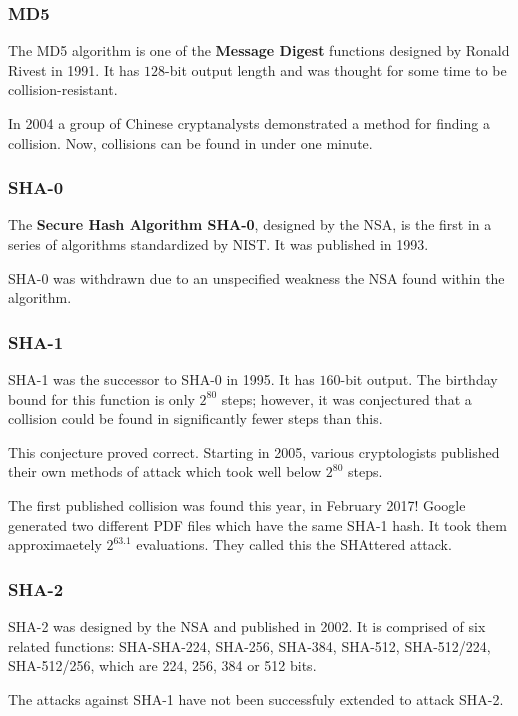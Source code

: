 \documentclass{beamer}
\newcommand{\<}{\langle}
\renewcommand{\>}{\rangle}
\begin{document}
\begin{frame}
\frametitle{MD5}

The MD5 algorithm is one of the \textbf{Message Digest} functions designed by Ronald Rivest in 1991. It has $128$-bit output length and was thought for some time to be collision-resistant. \newline

In 2004 a group of Chinese cryptanalysts demonstrated a method for finding a collision. Now, collisions can be found in under one minute. 
\end{frame}


\begin{frame}
\frametitle{SHA-0}

The \textbf{Secure Hash Algorithm SHA-0}, designed by the NSA, is the first in a series of algorithms standardized by NIST. It was published in 1993. \newline

SHA-0 was withdrawn due to an unspecified weakness the NSA found within the algorithm. 
\end{frame}


\begin{frame}
\frametitle{SHA-1}

SHA-1 was the successor to SHA-0 in 1995. It has $160$-bit output. The birthday bound for this function is only $2^{80}$ steps; however, it was conjectured that a collision could be found in significantly fewer steps than this. \newline

This conjecture proved correct. Starting in 2005, various cryptologists published their own methods of attack which took well below $2^{80}$ steps. \newline

The first published collision was found this year, in February 2017! Google generated two different PDF files which have the same SHA-1 hash. It took them approximaetely $2^{63.1}$ evaluations. They called this the SHAttered attack.
\end{frame}

\begin{frame}
\frametitle{SHA-2}

SHA-2 was designed by the NSA and published in 2002. It is comprised of six related functions: SHA-SHA-224, SHA-256, SHA-384, SHA-512, SHA-512/224, SHA-512/256, which are 224, 256, 384 or 512 bits. \newline

The attacks against SHA-1 have not been successfuly extended to attack SHA-2. 
\end{frame}
\end{document}
